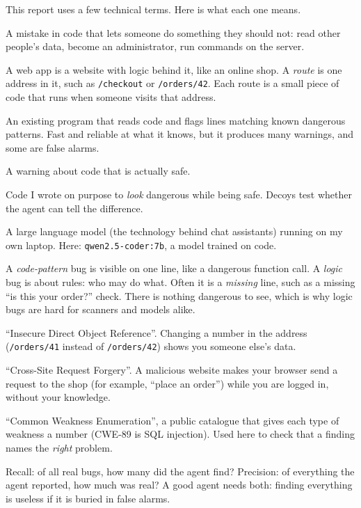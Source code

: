 \documentclass[11pt,a4paper]{article}
\newcommand{\code}[1]{\texttt{#1}}
\begin{document}
This report uses a few technical terms. Here is what each one means.

\begin{description}[style=nextline,leftmargin=1.2em,itemsep=4pt]
  \item[Vulnerability (bug, security hole)] A mistake in code that lets someone do something they should
        not: read other people's data, become an administrator, run commands on the server.
  \item[Web app, route] A web app is a website with logic behind it, like an online shop. A \emph{route} is
        one address in it, such as \code{/checkout} or \code{/orders/42}. Each route is a small piece of
        code that runs when someone visits that address.
  \item[Scanner] An existing program that reads code and flags lines matching known dangerous patterns.
        Fast and reliable at what it knows, but it produces many warnings, and some are false alarms.
  \item[False alarm (false positive)] A warning about code that is actually safe.
  \item[Decoy] Code I wrote on purpose to \emph{look} dangerous while being safe. Decoys test whether the
        agent can tell the difference.
  \item[Local model / LLM] A large language model (the technology behind chat assistants) running on my own
        laptop. Here: \code{qwen2.5-coder:7b}, a model trained on code.
  \item[Code-pattern bug vs.\ logic bug] A \emph{code-pattern} bug is visible on one line, like a
        dangerous function call. A \emph{logic} bug is about rules: who may do what. Often it is a
        \emph{missing} line, such as a missing ``is this your order?'' check. There is nothing dangerous to
        see, which is why logic bugs are hard for scanners and models alike.
  \item[IDOR] ``Insecure Direct Object Reference''. Changing a number in the address (\code{/orders/41}
        instead of \code{/orders/42}) shows you someone else's data.
  \item[CSRF] ``Cross-Site Request Forgery''. A malicious website makes your browser send a request to
        the shop (for example, ``place an order'') while you are logged in, without your knowledge.
  \item[CWE] ``Common Weakness Enumeration'', a public catalogue that gives each type of weakness a number
        (CWE-89 is SQL injection). Used here to check that a finding names the \emph{right} problem.
  \item[Recall (``found'') and precision] Recall: of all real bugs, how many did the agent find?
        Precision: of everything the agent reported, how much was real? A good agent needs both: finding
        everything is useless if it is buried in false alarms.
\end{description}
\end{document}
